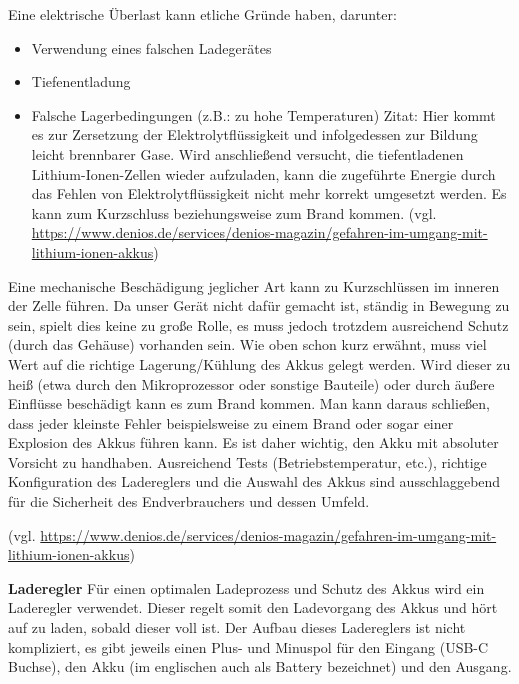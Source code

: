 \documentclass[]{article}
\begin{document}
Eine elektrische Überlast kann etliche Gründe haben, darunter: 
\begin{itemize}
	\item Verwendung eines falschen Ladegerätes
	\item Tiefenentladung
	\item Falsche Lagerbedingungen (z.B.: zu hohe Temperaturen) 
\newline
Zitat: \glqq Hier kommt es zur Zersetzung der Elektrolytflüssigkeit und infolgedessen zur Bildung leicht brennbarer Gase. Wird anschließend versucht, die tiefentladenen Lithium-Ionen-Zellen wieder aufzuladen, kann die zugeführte Energie durch das Fehlen von Elektrolytflüssigkeit nicht mehr korrekt umgesetzt werden. Es kann zum Kurzschluss beziehungsweise zum Brand kommen.\grqq{} (vgl. \url{https://www.denios.de/services/denios-magazin/gefahren-im-umgang-mit-lithium-ionen-akkus})
\end{itemize}
Eine mechanische Beschädigung jeglicher Art kann zu Kurzschlüssen im inneren der Zelle führen. Da unser Gerät nicht dafür gemacht ist, ständig in Bewegung zu sein, spielt dies keine zu große Rolle, es muss jedoch trotzdem ausreichend Schutz (durch das Gehäuse) vorhanden sein.
\vspace{4mm}\newline
Wie oben schon kurz erwähnt, muss viel Wert auf die richtige Lagerung/Kühlung des Akkus gelegt werden. Wird dieser zu heiß (etwa durch den Mikroprozessor oder sonstige Bauteile) oder durch äußere Einflüsse beschädigt kann es zum Brand kommen.
\vspace{4mm}\newline
Man kann daraus schließen, dass jeder kleinste Fehler beispielsweise zu einem Brand oder sogar einer Explosion des Akkus führen kann. Es ist daher wichtig, den Akku mit absoluter Vorsicht zu handhaben. Ausreichend Tests (Betriebstemperatur, etc.), richtige Konfiguration des Ladereglers und die Auswahl des Akkus sind ausschlaggebend für die Sicherheit des Endverbrauchers und dessen Umfeld.

(vgl. \url{https://www.denios.de/services/denios-magazin/gefahren-im-umgang-mit-lithium-ionen-akkus})

\textbf{Laderegler}\newline
Für einen optimalen Ladeprozess und Schutz des Akkus wird ein Laderegler verwendet. Dieser regelt somit den Ladevorgang des Akkus und hört auf zu laden, sobald dieser voll ist. Der Aufbau dieses Ladereglers ist nicht kompliziert, es gibt jeweils einen Plus- und Minuspol für den Eingang (USB-C Buchse), den Akku (im englischen auch als Battery bezeichnet) und den Ausgang.
\end{document}
